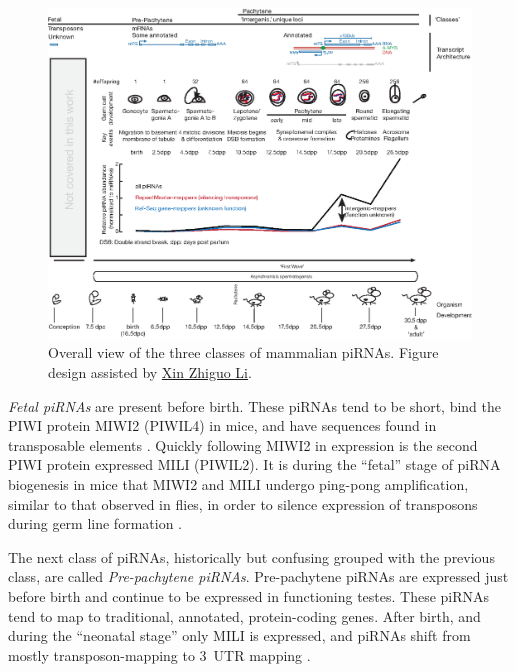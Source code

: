 {    \begin{landscape}
      \begin{figure} %
        \centering 
        \includegraphics{Figures/Intro/MammalianPiRNAClassesOverTime.eps}
        \caption[Different Classes of mammalian piRNAs]
        {
          Overall view of the three classes of mammalian piRNAs. Figure design assisted by \href{mailto:xin.li@umassmed.edu}{Xin Zhiguo Li}.
          } \label{Intro:fig:Mammalian piRNA classes}
        \end{figure}
      \end{landscape}

    \textit{Fetal piRNAs} are present before birth. These piRNAs tend to be short, bind the PIWI protein MIWI2 (PIWIL4) in mice, and have sequences found in transposable elements \citep{Carmell2007}. Quickly following MIWI2 in expression is the second PIWI protein expressed MILI (PIWIL2). It is during the ``fetal'' stage of piRNA biogenesis in mice that MIWI2 and MILI undergo ping-pong amplification, similar to that observed in flies, in order to silence expression of transposons during germ line formation  \citep{Kuramochi-Miyagawa2004, Aravin2006, Aravin2008a}.

    The next class of piRNAs, historically but confusing grouped with the previous class, are called \textit{Pre-pachytene piRNAs}. Pre-pachytene piRNAs are expressed just before birth and continue to be expressed in functioning testes. These piRNAs tend to map to traditional, annotated, protein-coding genes. After birth, and during the ``neonatal stage'' only MILI is expressed, and piRNAs shift from mostly transposon-mapping to 3\textprime~UTR mapping \citep{Robine2009}.

}
